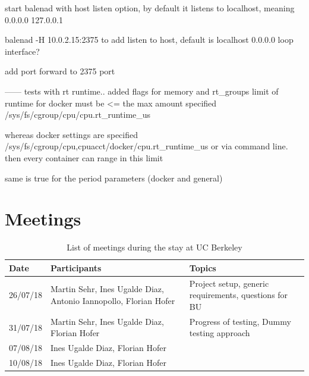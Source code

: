 \documentclass[]{scrartcl}
\begin{document}
start balenad with host listen option, by default it listens to localhost, meaning 0.0.0.0 127.0.0.1

balenad -H 10.0.2.15:2375 to add listen to host, default is localhost 0.0.0.0 loop interface?

add port forward to 2375 port


------
tests with rt runtime..
added flags for memory and rt_groups
limit of runtime for docker must be <= the max amount specified
/sys/fs/cgroup/cpu/cpu.rt\_runtime\_us 

whereas docker settings are specified 
/sys/fs/cgroup/cpu,cpuacct/docker/cpu.rt\_runtime\_us
or via command line. then every container can range in this limit

same is true for the period parameters (docker and general)


\section{Meetings}

\begin{table}[h]
	\centering
	\caption{List of meetings during the stay at UC Berkeley}
	
	\begin{tabular}{l p{5cm} p{5cm}}
	Date & Participants & Topics \\
	\hline
	26/07/18 & Martin Sehr, Ines Ugalde Diaz, Antonio Iannopollo, Florian Hofer & Project setup, generic requirements, questions for BU\\
	31/07/18 & Martin Sehr, Ines Ugalde Diaz, Florian Hofer & Progress of testing, Dummy testing approach\\
	07/08/18 & Ines Ugalde Diaz, Florian Hofer & \\
	10/08/18 & Ines Ugalde Diaz, Florian Hofer & \\
	\hline
	\end{tabular}
	
	\label{tab:meeting}
\end{table}
\end{document}
